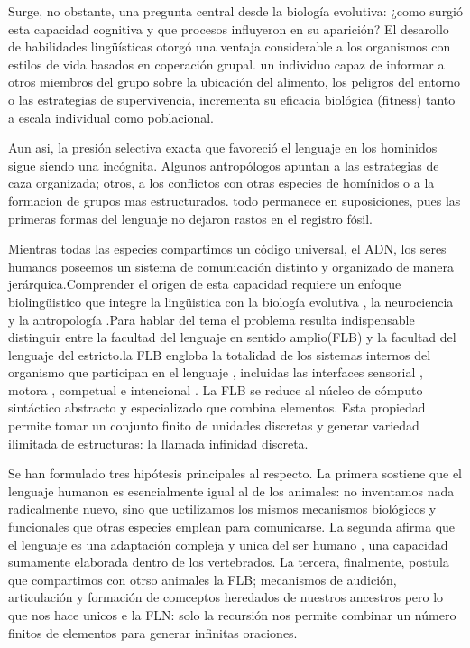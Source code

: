 \documentclass[12pt]{article}
\begin{document}
Surge, no obstante, una pregunta central desde la biología evolutiva: ¿como surgió esta capacidad cognitiva y que procesos influyeron en su aparición? El desarollo de habilidades lingüísticas otorgó una ventaja considerable a los organismos con estilos de vida basados en coperación grupal. un individuo capaz de informar a otros miembros del grupo sobre la ubicación del alimento, los peligros del entorno o las estrategias de supervivencia, incrementa su eficacia biológica (fitness) tanto a escala individual como poblacional.

Aun asi, la presión selectiva exacta que favoreció el lenguaje en los hominidos sigue siendo una incógnita. Algunos antropólogos apuntan a las estrategias de caza organizada; otros, a los conflictos con otras especies de homínidos o a la formacion de grupos mas estructurados. todo permanece en suposiciones, pues las primeras formas del lenguaje no dejaron rastos en el registro fósil.

Mientras todas las especies compartimos un código universal, el ADN, los seres humanos poseemos un sistema  de comunicación distinto y organizado de manera jerárquica.Comprender el origen de esta capacidad requiere un enfoque  biolingüistico que integre la lingüistica con la biología evolutiva , la neurociencia y la antropología .Para hablar del tema el problema resulta indispensable distinguir entre la facultad del lenguaje en sentido amplio(FLB) y la facultad del lenguaje del estricto.la FLB engloba la totalidad de los sistemas internos del organismo que participan en el lenguaje , incluidas las interfaces sensorial , motora , competual e intencional . La FLB se reduce  al núcleo  de cómputo sintáctico abstracto y especializado que combina elementos. Esta propiedad permite tomar un conjunto finito de unidades discretas y generar variedad ilimitada de estructuras: la llamada infinidad discreta.

Se han formulado tres hipótesis principales al respecto. La primera sostiene que el lenguaje humanon es esencialmente igual al de los animales: no inventamos nada radicalmente nuevo, sino que uctilizamos los mismos mecanismos biológicos  y funcionales que otras especies emplean para comunicarse. La segunda afirma que el lenguaje es una adaptación compleja y unica del ser humano , una capacidad sumamente elaborada dentro de los vertebrados. La tercera, finalmente, postula que compartimos con otrso animales la FLB; mecanismos de audición, articulación y formación de comceptos heredados de nuestros ancestros pero lo que nos hace unicos e la FLN: solo la recursión nos permite combinar un número finitos de elementos para generar infinitas oraciones.
\end{document}
